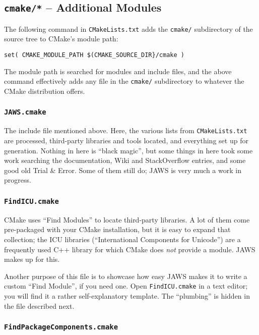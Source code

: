 \subsection{\texttt{cmake/*} -- Additional Modules}

The following command in \lstinline{CMakeLists.txt} adds the \lstinline{cmake/} subdirectory of the source tree to CMake's module path:

\begin{lstlisting}
set( CMAKE_MODULE_PATH $(CMAKE_SOURCE_DIR}/cmake )
\end{lstlisting}

The module path is searched for modules and include files, and the above command effectively adds any file in the \lstinline{cmake/} subdirectory to whatever the CMake distribution offers.

\subsubsection{\texttt{JAWS.cmake}}

The include file mentioned above. Here, the various lists from \lstinline{CMakeLists.txt} are processed, third-party libraries and tools located, and everything set up for generation. Nothing in here is ``black magic'', but some things in here took some work searching the documentation, Wiki and StackOverflow entries, and some good old Trial \& Error. Some of them still do; JAWS is very much a work in progress.

\subsubsection{\texttt{FindICU.cmake}}

CMake uses ``Find Modules'' to locate third-party libraries. A lot of them come pre-packaged with your CMake installation, but it is easy to expand that collection; the ICU libraries (``International Components for Unicode'') are a frequently used C++ library for which CMake does \emph{not} provide a module. JAWS makes up for this.

Another purpose of this file is to showcase how easy JAWS makes it to write a custom ``Find Module'', if you need one. Open \lstinline{FindICU.cmake} in a text editor; you will find it a rather self-explanatory template. The ``plumbing'' is hidden in the file described next.

\subsubsection{\texttt{FindPackageComponents.cmake}}

